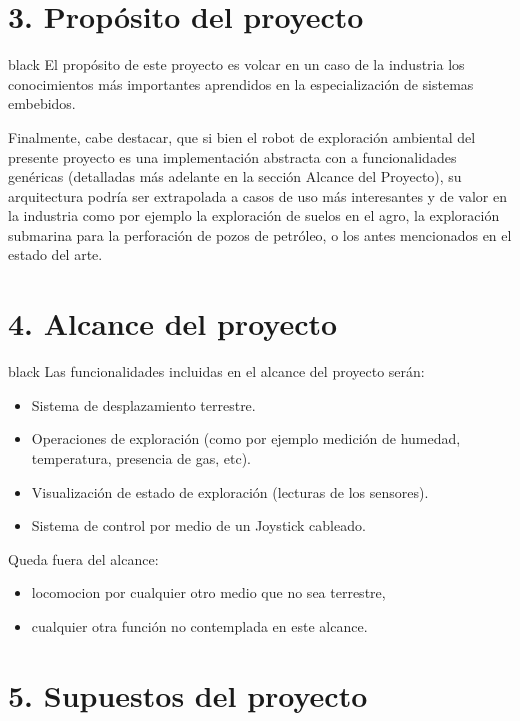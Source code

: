 \documentclass[
11pt, %
codirector, %
]{charter}
\begin{document}
\section{3. Propósito del proyecto}
\label{sec:proposito}

\begin{consigna}{black}
El propósito de este proyecto es volcar en un caso de la industria los conocimientos más importantes aprendidos en la especialización de sistemas embebidos.

Finalmente, cabe destacar, que si bien el robot de exploración ambiental del presente proyecto es una implementación abstracta con a funcionalidades genéricas (detalladas más adelante en la sección Alcance del Proyecto), su arquitectura podría ser extrapolada a casos de uso más interesantes y de valor en la industria como por ejemplo la exploración de suelos en el agro, la exploración submarina para la perforación de pozos de petróleo, o los antes mencionados en el estado del arte.

\end{consigna}

\section{4. Alcance del proyecto}
\label{sec:alcance}

\begin{consigna}{black}
Las funcionalidades incluidas en el alcance del proyecto serán:
\begin{itemize}
	\item Sistema de desplazamiento terrestre.
	\item Operaciones de exploración (como por ejemplo medición de humedad, temperatura, presencia de gas, etc).
	\item Visualización de estado de exploración (lecturas de los sensores).
	\item Sistema de control por medio de un Joystick cableado.
\end{itemize}

Queda fuera del alcance:
\begin{itemize}
	\item locomocion por cualquier otro medio que no sea terrestre,
	\item cualquier otra función no contemplada en este alcance.
\end{itemize}
\end{consigna}


\section{5. Supuestos del proyecto}
\label{sec:supuestos}
\end{document}
